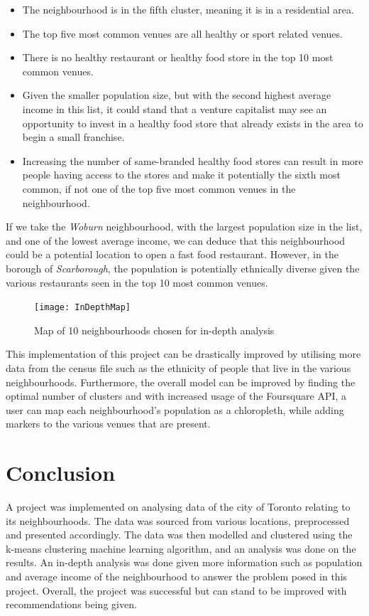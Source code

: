 \documentclass[12pt, conference]{IEEEtran}
\begin{document}
\begin{itemize}
\item The neighbourhood is in the fifth cluster, meaning it is in a residential area.
\item The top five most common venues are all healthy or sport related venues.
\item There is no healthy restaurant or healthy food store in the top 10 most common venues.
\item Given the smaller population size, but with the second highest average income in this list, it could stand that a venture capitalist may see an opportunity to invest in a healthy food store that already exists in the area to begin a small franchise.
\item Increasing the number of same-branded healthy food stores can result in more people having access to the stores and make it potentially the sixth most common, if not one of the top five most common venues in the neighbourhood.
\end{itemize}

If we take the \textit{Woburn} neighbourhood, with the largest population size in the list, and one of the lowest average income, we can deduce that this neighbourhood could be a potential location to open a fast food restaurant. However, in the borough of \textit{Scarborough}, the population is potentially ethnically diverse given the various restaurants seen in the top 10 most common venues.

\begin{figure}[!h]
\center
\texttt{[image: InDepthMap]}
\caption{Map of 10 neighbourhoods chosen for in-depth analysis}
\label{fig: InDepthMap}
\end{figure}

This implementation of this project can be drastically improved by utilising more data from the census file such as the ethnicity of people that live in the various neighbourhoods. Furthermore, the overall model can be improved by finding the optimal number of clusters and with increased usage of the Foursquare API, a user can map each neighbourhood's population as a chloropleth, while adding markers to the various venues that are present.

\section{\textbf{Conclusion}}
\label{sec: Conclusion}
A project was implemented on analysing data of the city of Toronto relating to its neighbourhoods. The data was sourced from various locations, preprocessed and presented accordingly. The data was then modelled and clustered using the k-means clustering machine learning algorithm, and an analysis was done on the results. An in-depth analysis was done given more information such as population and average income of the neighbourhood to answer the problem posed in this project. Overall, the project was successful but can stand to be improved with recommendations being given.
\end{document}

